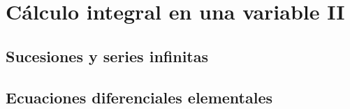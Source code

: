 \chapter{Cálculo integral en una variable II} %
\label{cha:calculo_integral_en_una_variable_ii}

\section{Sucesiones y series infinitas} %
\label{sec:sucesiones_y_series_infinitas}

\section{Ecuaciones diferenciales elementales} %
\label{sec:ecuaciones_diferenciales_elementales}

